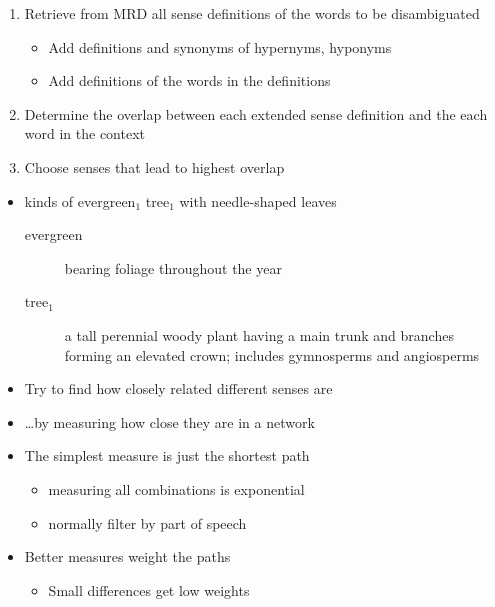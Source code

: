 \documentclass[a4paper,landscape,headrule,footrule,xetex]{foils}
\begin{document}

\begin{enumerate}
\item Retrieve from MRD all sense definitions of the words to be disambiguated
  \begin{itemize}
  \item Add definitions and synonyms of hypernyms, hyponyms 
  \item Add definitions of the  words in the definitions
  \end{itemize}
\item Determine the overlap between each extended sense definition and
  the each word in the context
\item Choose senses that lead to highest overlap
\end{enumerate}

\begin{itemize}
\item kinds of evergreen$_1$ tree$_1$ with needle-shaped leaves
  \begin{description}
  \item[evergreen] bearing  foliage throughout the year
  \item[tree$_1$] a  tall perennial woody plant having a main trunk and branches forming an elevated crown; includes gymnosperms and angiosperms
  \end{description}
\end{itemize}


\begin{itemize}
\item Try to find how closely related different senses are
\item \ldots by measuring how close they are in a network
\item The simplest measure is just the shortest path
  \begin{itemize}
  \item measuring all combinations is exponential
  \item normally filter by part of speech
  \end{itemize}
\item Better measures weight the paths
  \begin{itemize}
  \item Small differences get low weights
  \end{itemize}
\end{itemize}
\end{document}
